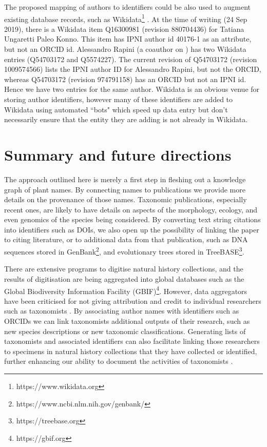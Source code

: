 \documentclass[runningheads]{llncs}
\begin{document}
The proposed mapping of authors to identifiers could be also used to augment existing database records, such as Wikidata\footnote{https://www.wikidata.org} \cite{vrandecic_wikidata_2014}. At the time of writing (24 Sep 2019), there is a Wikidata item Q16300981 (revision 880704436) for Tatiana Ungaretti Paleo Konno. This item has IPNI author id 40176-1 as an attribute, but not an ORCID id. Alessandro Rapini (a coauthor on \cite{konno_new_2006}) has two Wikidata entries (Q54703172 and Q5574227). The current revision of Q54703172 (revision 1009574566) lists the IPNI author ID for Alessandro Rapini, but not the ORCID, whereas Q54703172 (revision 974791158) has an ORCID but not an IPNI id. Hence we have two entries for the same author. Wikidata is an obvious venue for storing author identifiers, however many of these identifiers are added to Wikidata using automated ``bots" which speed up data entry but don’t necessarily ensure that the entity they are adding is not already in Wikidata.

\section{Summary and future directions}

The approach outlined here is merely a first step in fleshing out a knowledge graph of plant names. By connecting names to publications we provide more details on the provenance of those names. Taxonomic publications, especially recent ones, are likely to have details on aspects of the morphology, ecology, and even genomics of the  species being considered. By converting text string citations into identifiers such as DOIs, we also open up the possibility of linking the paper to citing literature, or to additional data from that publication, such as DNA sequences stored in GenBank\footnote{https://www.ncbi.nlm.nih.gov/genbank/}, and evolutionary trees stored in TreeBASE\footnote{https://treebase.org}. 

There are extensive programs to digitise natural history collections, and the results of digitisation are being aggregated into global databases such as the Global Biodiversity Information Facility (GBIF)\footnote{https://gbif.org}. However, data aggregators have been criticised for not giving attribution and credit to individual researchers such as taxonomists \cite{franz_increase_2018}.  By associating author names with identifiers such as ORCIDs we can link taxonomists additional outputs of their research, such as new species descriptions or new taxonomic classifications. Generating lists of taxonomists and associated identifiers can also facilitate linking those researchers to specimens in natural history collections that they have collected or identified, further enhancing our ability to document the activities of taxonomists \cite{shorthouse_quantifying_2019}.
\end{document}
